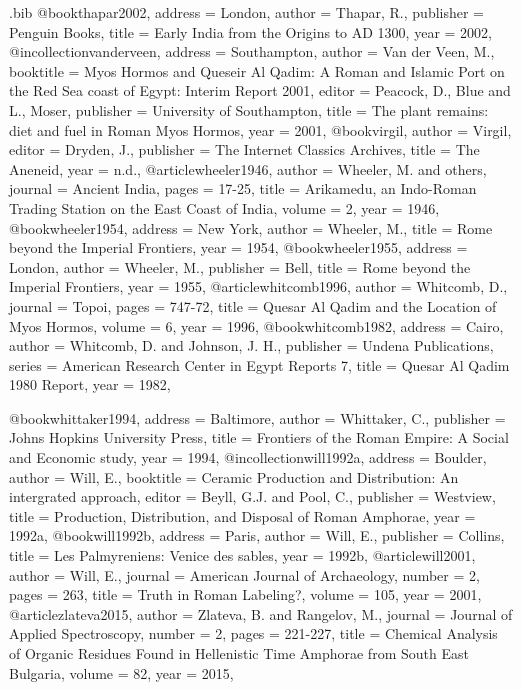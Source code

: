 \begin{filecontents}{\IJSRAidentifier.bib}
@book{thapar2002,
	address = {London},
	author = {Thapar, R.},
	publisher = {Penguin Books},
	title = {Early India from the Origins to AD 1300},
	year = {2002},
}
@incollection{vanderveen,
	address = {Southampton},
	author = {Van der Veen, M.},
	booktitle = {Myos Hormos and Queseir Al Qadim: A Roman and Islamic Port on the Red Sea coast of Egypt: Interim Report 2001},
	editor = {Peacock, D., Blue and L., Moser},
	publisher = {University of Southampton},
	title = {The plant remains: diet and fuel in Roman Myos Hormos},
	year = {2001},
}%
@book{virgil,
	author = {Virgil},
	editor = {Dryden, J.},
	publisher = {The Internet Classics Archives},
	title = {The Aneneid},
	year = {n.d.},
}
@article{wheeler1946,
	author = {Wheeler, M. and others},
	journal = {Ancient India},
	pages = {17-25},
	title = {Arikamedu, an Indo-Roman Trading Station on the East Coast of India},
	volume = {2},
	year = {1946},
}
@book{wheeler1954,
	address = {New York},
	author = {Wheeler, M.},
	title = {Rome beyond the Imperial Frontiers},
	year = {1954},
}
@book{wheeler1955,
	address = {London},
	author = {Wheeler, M.},
	publisher = {Bell},
	title = {Rome beyond the Imperial Frontiers},
	year = {1955},
}
@article{whitcomb1996,
	author = {Whitcomb, D.},
	journal = {Topoi},
	pages = {747-72},
	title = {Quesar Al Qadim and the Location of Myos Hormos},
	volume = {6},
	year = {1996},
}
@book{whitcomb1982,
	address = {Cairo},
	author = {Whitcomb, D. and Johnson, J. H.},
	publisher = {Undena Publications},
	series = {American Research Center in Egypt Reports 7},
	title = {Quesar Al Qadim 1980 Report},
	year = {1982},
}

@book{whittaker1994,
	address = {Baltimore},
	author = {Whittaker, C.},
	publisher = {Johns Hopkins University Press},
	title = {Frontiers of the Roman Empire: A Social and Economic study},
	year = {1994},
}
@incollection{will1992a,
	address = {Boulder},
	author = {Will, E.},
	booktitle = {Ceramic Production and Distribution: An intergrated approach},
	editor = {Beyll, G.J. and Pool, C.},
	publisher = {Westview},
	title = {Production, Distribution, and Disposal of Roman Amphorae},
	year = {1992a},
}
@book{will1992b,
	address = {Paris},
	author = {Will, E.},
	publisher = {Collins},
	title = {Les Palmyreniens: Venice des sables},
	year = {1992b},
}
@article{will2001,
	author = {Will, E.},
	journal = {American Journal of Archaeology},
	number = {2},
	pages = {263},
	title = {Truth in Roman Labeling?},
	volume = {105},
	year = {2001},
}
@article{zlateva2015,
	author = {Zlateva, B. and Rangelov, M.},
	journal = {Journal of Applied Spectroscopy},
	number = {2},
	pages = {221-227},
	title = {Chemical Analysis of Organic Residues Found in Hellenistic Time Amphorae from South East Bulgaria},
	volume = {82},
	year = {2015},
}

\end{filecontents}
\IJSRAopening%

